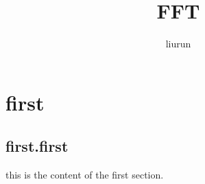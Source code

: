 \documentclass[12pt,a4paper]{article}
\title{FFT}
\author{liurun}
\begin{document}
\maketitle
\section{first}
\subsection{first.first}
this is the content of the first section.
\end{document}
